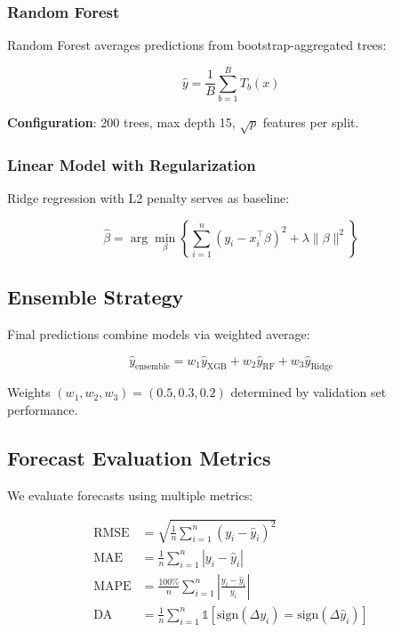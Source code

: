 \documentclass[12pt,a4paper]{article}
\begin{document}
\subsubsection{Random Forest}

Random Forest \citep{breiman2001random} averages predictions from bootstrap-aggregated trees:

\begin{equation}
\hat{y} = \frac{1}{B} \sum_{b=1}^B T_b(x)
\end{equation}

\textbf{Configuration}: 200 trees, max depth 15, $\sqrt{p}$ features per split.

\subsubsection{Linear Model with Regularization}

Ridge regression with L2 penalty serves as baseline:

\begin{equation}
\hat{\beta} = \arg\min_\beta \left\{ \sum_{i=1}^n (y_i - x_i^\top \beta)^2 + \lambda \|\beta\|^2 \right\}
\end{equation}

\subsection{Ensemble Strategy}

Final predictions combine models via weighted average:

\begin{equation}
\hat{y}_{\text{ensemble}} = w_1 \hat{y}_{\text{XGB}} + w_2 \hat{y}_{\text{RF}} + w_3 \hat{y}_{\text{Ridge}}
\end{equation}

Weights $(w_1, w_2, w_3) = (0.5, 0.3, 0.2)$ determined by validation set performance.

\subsection{Forecast Evaluation Metrics}

We evaluate forecasts using multiple metrics:

\begin{align}
\text{RMSE} &= \sqrt{\frac{1}{n}\sum_{i=1}^n (y_i - \hat{y}_i)^2} \\
\text{MAE} &= \frac{1}{n}\sum_{i=1}^n |y_i - \hat{y}_i| \\
\text{MAPE} &= \frac{100\%}{n}\sum_{i=1}^n \left|\frac{y_i - \hat{y}_i}{y_i}\right| \\
\text{DA} &= \frac{1}{n}\sum_{i=1}^n \mathbb{1}[\text{sign}(\Delta y_i) = \text{sign}(\Delta \hat{y}_i)]
\end{align}
\end{document}
